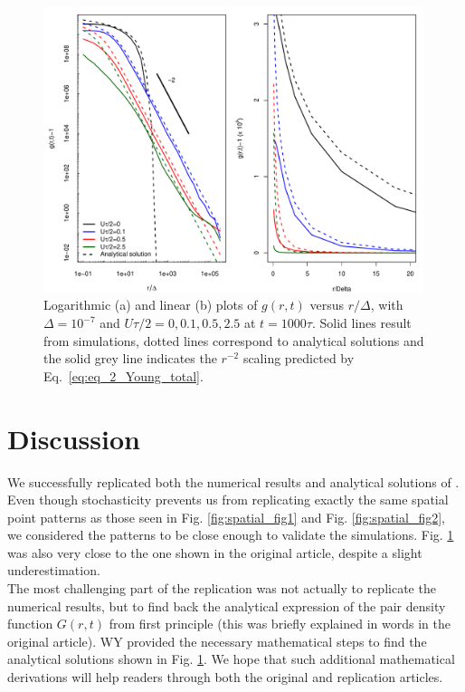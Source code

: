 \begin{figure}[H]
\begin{center}
 \includegraphics[width=0.99\textwidth]{../code/simulation/pcf_test_Utot_modif_dx_dp.pdf}
 \caption{Logarithmic (a) and linear (b) plots of $g(r,t)$ versus $r/\Delta$, with $\Delta=10^{-7}$ and $U\tau/2=0,0.1,0.5,2.5$ at $t=1000\tau$. Solid lines result from simulations, dotted lines correspond to analytical solutions and the solid grey line indicates the $r^{-2}$ scaling predicted by Eq.~\ref{eq:eq_2_Young_total}.}
  \label{fig:pcf_Fig3}
\end{center}
  \end{figure} 
 
\section*{Discussion}

We successfully replicated both the numerical results and analytical solutions of \citep{young_reproductive_2001}. Even though stochasticity prevents us from replicating exactly the same spatial point patterns as those seen in Fig. \ref{fig:spatial_fig1} and Fig. \ref{fig:spatial_fig2}, we considered the patterns to be close enough to validate the simulations. Fig. \ref{fig:pcf_Fig3} was also very close to the one shown in the original article, despite a slight underestimation.\\

The most challenging part of the replication was not actually to replicate the numerical results, but to find back the analytical expression of the pair density function $G(r,t)$ from first principle (this was briefly explained in words in the original article). WY provided the necessary mathematical steps to find the analytical solutions shown in Fig. \ref{fig:pcf_Fig3}. We hope that such additional mathematical derivations will help readers through both the original and replication articles. \\

